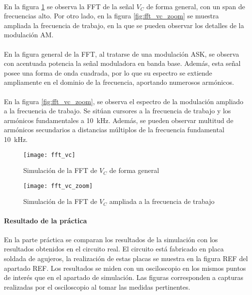 \paragraph{}
En la figura \ref{fig:sim_fft} se observa la FFT de la señal $V_C$ de forma general, con un span de frecuencias alto. Por otro lado, en la figura \ref{fig:fft_vc_zoom} se muestra ampliada la frecuencia de trabajo, en la que se pueden observar los detalles de la modulación AM.
\paragraph{}
En la figura general de la FFT, al tratarse de una modulación ASK, se observa con acentuada potencia la señal moduladora en banda base. Además, esta señal posee una forma de onda cuadrada, por lo que su espectro se extiende ampliamente en el dominio de la frecuencia, aportando numerosos armónicos.
\paragraph{}
En la figura \ref{fig:fft_vc_zoom}, se observa el espectro de la modulación ampliado a la frecuencia de trabajo. Se sitúan cursores a la frecuencia de trabajo y los armónicos fundamentales a \SI{10}{\kilo\hertz}. Además, se pueden observar multitud de armónicos secundarios a distancias múltiplos de la frecuencia fundamental \SI{10}{\kilo\hertz}.
\begin{figure}[h!]
    \centering
    \texttt{[image: fft\_vc]}
    \caption{Simulaci\'on de la FFT de $V_C$ de forma general}
    \label{fig:sim_fft}
\end{figure}
\begin{figure}[h!]
    \centering
    \texttt{[image: fft\_vc\_zoom]}
    \caption{Simulaci\'on de la FFT de $V_C$ ampliada a la frecuencia de trabajo}
    \label{fig:sim_fft_zoom}
\end{figure}

\paragraph{Resultado de la pr\'actica} %
\paragraph{}
En la parte práctica se comparan los resultados de la simulación con los resultados obtenidos en el circuito real. El circuito está fabricado en placa soldada de agujeros, la realizaci\'on de estas placas se muestra en la figura REF del apartado REF. Los resultados se miden con un osciloscopio en los mismos puntos de interés que en el apartado de simulación. Las figuras corresponden a capturas realizadas por el osciloscopio al tomar las medidas pertinentes.

